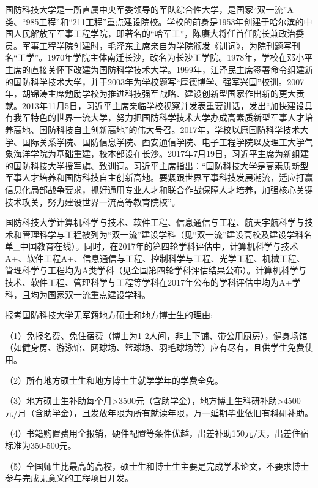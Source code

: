\begin{cabstract}
国防科技大学是一所直属中央军委领导的军队综合性大学，是国家“双一流”A类、“985工程”和“211工程”重点建设院校。学校的前身是1953年创建于哈尔滨的中国人民解放军军事工程学院，即著名的“哈军工”，陈赓大将任首任院长兼政治委员。军事工程学院创建时，毛泽东主席亲自为学院颁发《训词》，为院刊题写刊名“工学”。1970年学院主体南迁长沙，改名为长沙工学院。1978年，学校在邓小平主席的直接关怀下改建为国防科学技术大学。1999年，江泽民主席签署命令组建新的国防科学技术大学，并于2003年为学校题写“厚德博学、强军兴国”校训。2007年，胡锦涛主席勉励学校为推进科技强军战略、建设创新型国家作出新的更大贡献。2013年11月5日，习近平主席亲临学校视察并发表重要讲话，发出“加快建设具有我军特色的世界一流大学，努力把国防科学技术大学办成高素质新型军事人才培养高地、国防科技自主创新高地”的伟大号召。2017年，学校以原国防科学技术大学、国际关系学院、国防信息学院、西安通信学院、电子工程学院以及理工大学气象海洋学院为基础重建，校本部设在长沙。2017年7月19日，习近平主席为新组建的国防科技大学授军旗、致训词。习近平主席指出：“国防科技大学是高素质新型军事人才培养和国防科技自主创新高地。要紧跟世界军事科技发展潮流，适应打赢信息化局部战争要求，抓好通用专业人才和联合作战保障人才培养，加强核心关键技术攻关，努力建设世界一流高等教育院校”。

国防科技大学计算机科学与技术、软件工程、信息通信与工程、航天宇航科学与技术和管理科学与工程被列为“双一流”建设学科（见“双一流”建设高校及建设学科名单\_中国教育在线）。同时，在2017年的第四轮学科评估中，计算机科学与技术A+、软件工程A+、信息通信与工程、控制科学与工程、光学工程、机械工程、管理科学与工程均为A类学科（见全国第四轮学科评估结果公布）。计算机科学与技术、软件工程、管理科学与工程等学科在2017年公布的学科评估中均为A+学科，且均为国家双一流重点建设学科。

报考国防科技大学无军籍地方硕士和地方博士生的理由:

（1）免报名费、免住宿费（博士为1-2人间，非上下铺、带公用厨房），健身场馆（如健身房、游泳馆、网球场、篮球场、羽毛球场等）应有尽有，且供学生免费使用。

（2）所有地方硕士生和地方博士生就学学年的学费全免。

（3）地方硕士生补助每个月>3500元（含助学金），地方博士生科研补助>4500元/月（含助学金），且发放年限为所有就读年限，万一延期毕业依旧有科研补助。

（4）书籍购置费用全报销，硬件配置等条件优越，出差补助150元/天，出差住宿标准为350-500元。

（5）全国师生比最高的高校，硕士生和博士生主要是完成学术论文，不要求博士参与完成无意义的工程项目开发。

\end{cabstract}


